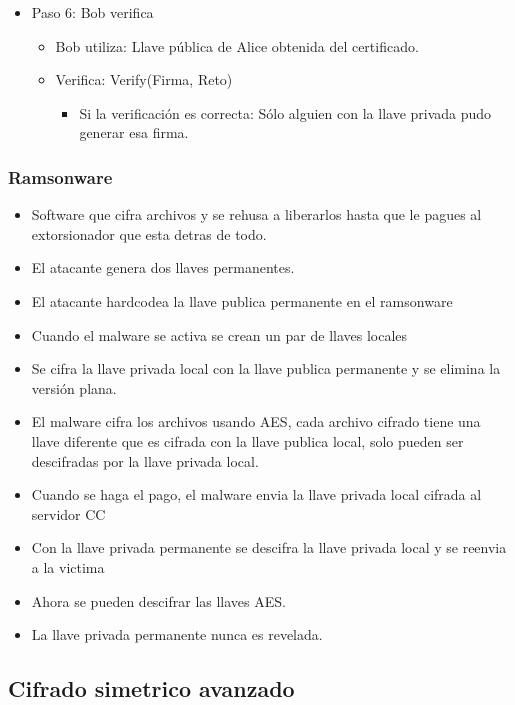 \documentclass[11pt]{article}
\begin{document}
\begin{itemize}
\item Paso 6: Bob verifica
\begin{itemize}
\item Bob utiliza: Llave pública de Alice obtenida del certificado.
\item Verifica: Verify(Firma, Reto)
\begin{itemize}
\item Si la verificación es correcta: Sólo alguien con la llave privada pudo generar esa firma.
\end{itemize}
\end{itemize}
\end{itemize}
\subsubsection{Ramsonware}
\label{sec:orgd64531f}
\begin{itemize}
\item Software que cifra archivos y se rehusa a liberarlos hasta que le pagues al extorsionador que esta detras de todo.

\item El atacante genera dos llaves permanentes.
\item El atacante hardcodea la llave publica permanente en el ramsonware
\item Cuando el malware se activa se crean un par de llaves locales
\item Se cifra la llave privada local con la llave publica permanente y se elimina la versión plana.
\item El malware cifra los archivos usando AES, cada archivo cifrado tiene una llave diferente que es cifrada con la llave publica local, solo pueden ser descifradas por la llave privada local.
\item Cuando se haga el pago, el malware envia la llave privada local cifrada al servidor CC
\item Con la llave privada permanente se descifra la llave privada local y se reenvia a la victima
\item Ahora se pueden descifrar las llaves AES.
\item La llave privada permanente nunca es revelada.
\end{itemize}
\subsection{Cifrado simetrico avanzado}
\label{sec:org275ac68}
\end{document}
